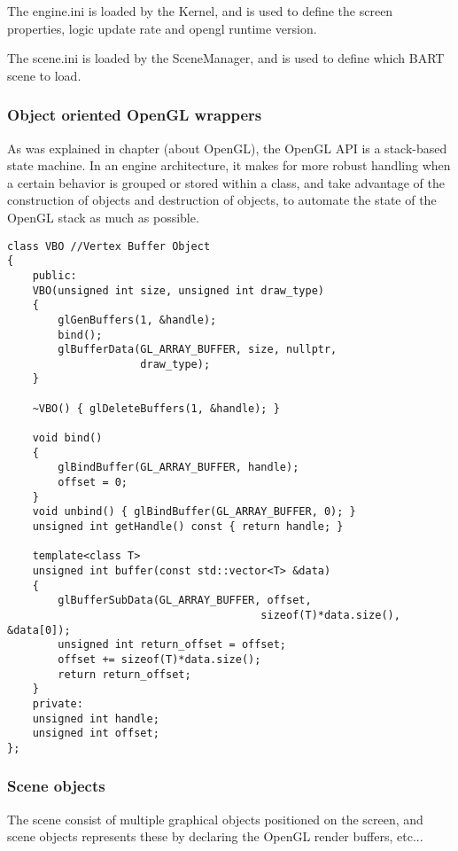 The engine.ini is loaded by the Kernel, and is used to define the screen properties, logic update rate and opengl runtime version.

The scene.ini is loaded by the SceneManager, and is used to define which BART scene to load.

\subsubsection{Object oriented OpenGL wrappers}
As was explained in chapter (about OpenGL), the OpenGL API is a stack-based state machine. In an engine architecture, it makes for more robust handling when a certain behavior is grouped or stored within a class, and take advantage of the construction of objects and destruction of objects, to automate the state of the OpenGL stack as much as possible.

\begin{lstlisting}
class VBO //Vertex Buffer Object
{
	public:
	VBO(unsigned int size, unsigned int draw_type)
	{
		glGenBuffers(1, &handle);
		bind();
		glBufferData(GL_ARRAY_BUFFER, size, nullptr, 
		             draw_type);
	}
	
	~VBO() { glDeleteBuffers(1, &handle); }
	
	void bind()
	{
		glBindBuffer(GL_ARRAY_BUFFER, handle);
		offset = 0;
	}
	void unbind() { glBindBuffer(GL_ARRAY_BUFFER, 0); }
	unsigned int getHandle() const { return handle; }
	
	template<class T>
	unsigned int buffer(const std::vector<T> &data)
	{
		glBufferSubData(GL_ARRAY_BUFFER, offset, 
										sizeof(T)*data.size(), &data[0]);
		unsigned int return_offset = offset;
		offset += sizeof(T)*data.size();
		return return_offset;
	}
	private:
	unsigned int handle;
	unsigned int offset;
};
\end{lstlisting}

\subsubsection{Scene objects}

The scene consist of multiple graphical objects positioned on the screen, and scene objects represents these by declaring the OpenGL render buffers, etc...


